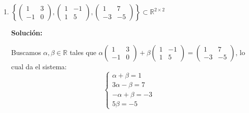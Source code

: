 \documentclass[12pt]{article}
\newcommand{\solucion}{%
    \vspace{0.8em}%
    \textbf{Solución:}%
    \vspace{0.8em}%
}
\begin{document}
\begin{enumerate}[label=\alph*.-]
    Como tenemos 3 vectores en $\mathbb{R}^3$, planteamos el determinante de la matriz formada por ellos:
    \[
    \begin{vmatrix} 1 & 3 & 5 \\ 2 & 1 & -1 \\ 4 & 7 & 9 \end{vmatrix}
    = 1(9+7) - 3(18+4) + 5(14-4) = 16 - 66 + 50 = 0
    \]

    Como el determinante es $0$, el conjunto es linealmente dependiente. Buscamos la combinación: $\alpha(1,3,5)+\beta(2,1,-1)=(4,7,9)$:
    \[
    \begin{cases}
    \alpha+2\beta=4 \\
    3\alpha+\beta=7 \\
    5\alpha-\beta=9
    \end{cases}
    \]

    De la primera: $\alpha=4-2\beta$. Sustituyendo en la segunda: $3(4-2\beta)+\beta=7 \Rightarrow 12-5\beta=7 \Rightarrow \beta=1,\; \alpha=2$.

    Verificamos en la tercera: $5(2)-1=9$ \checkmark

    \textbf{Conclusión:} el conjunto es \textbf{linealmente dependiente}, pues $(4,7,9)=2(1,3,5)+(2,1,-1)$.

    \item $\left\{ \begin{pmatrix} 1 & 3 \\ -1 & 0 \end{pmatrix}, \begin{pmatrix} 1 & -1 \\ 1 & 5 \end{pmatrix}, \begin{pmatrix} 1 & 7 \\ -3 & -5 \end{pmatrix} \right\} \subset \mathbb{R}^{2\times2}$

    \solucion

    Buscamos $\alpha,\beta \in \mathbb{R}$ tales que $\alpha\begin{pmatrix}1&3\\-1&0\end{pmatrix}+\beta\begin{pmatrix}1&-1\\1&5\end{pmatrix}=\begin{pmatrix}1&7\\-3&-5\end{pmatrix}$, lo cual da el sistema:
    \[
    \begin{cases}
    \alpha+\beta=1 \\
    3\alpha-\beta=7 \\
    -\alpha+\beta=-3 \\
    5\beta=-5
    \end{cases}
    \]


\end{enumerate}
\end{document}
